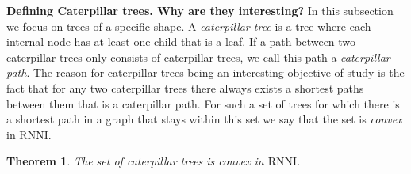 \documentclass[11pt]{amsart}
\newtheorem{theorem}{Theorem}
\newcommand{\rnni}{\mathrm{RNNI}}
\newcommand{\summary}[1]{\textbf{#1}} %
\begin{document}
\summary{Defining Caterpillar trees. Why are they interesting?}
In this subsection we focus on trees of a specific shape.
A \emph{caterpillar tree} is a tree where each internal node has at least one child that is a leaf.
If a path between two caterpillar trees only consists of caterpillar trees, we call this path a \emph{caterpillar path}.
The reason for caterpillar trees being an interesting objective of study is the fact that for any two caterpillar trees there always exists a shortest paths between them that is a caterpillar path.
For such a set of trees for which there is a shortest path in a graph that stays within this set we say that the set is \emph{convex} in $\rnni$.

\begin{theorem}
	The set of caterpillar trees is convex in $\rnni$.
	\label{thm:caterpillar_convex_rnni}
\end{theorem}
\end{document}
